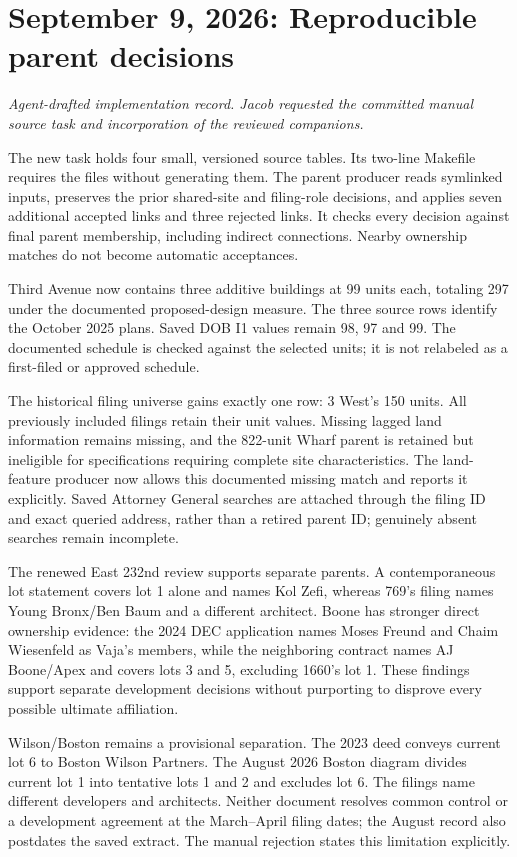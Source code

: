 \clearpage
\section*{September 9, 2026: Reproducible parent decisions}
\textit{Agent-drafted implementation record. Jacob requested the committed manual source task and incorporation of the reviewed companions.}

The new  task holds four small, versioned source tables. Its two-line Makefile requires the files without generating them. The parent producer reads symlinked inputs, preserves the prior shared-site and filing-role decisions, and applies seven additional accepted links and three rejected links. It checks every decision against final parent membership, including indirect connections. Nearby ownership matches do not become automatic acceptances.

Third Avenue now contains three additive buildings at 99 units each, totaling 297 under the documented proposed-design measure. The three source rows identify the October 2025 plans. Saved DOB I1 values remain 98, 97 and 99. The documented schedule is checked against the selected units; it is not relabeled as a first-filed or approved schedule.

The historical filing universe gains exactly one row: 3 West's 150 units. All previously included filings retain their unit values. Missing lagged land information remains missing, and the 822-unit Wharf parent is retained but ineligible for specifications requiring complete site characteristics. The land-feature producer now allows this documented missing match and reports it explicitly. Saved Attorney General searches are attached through the filing ID and exact queried address, rather than a retired parent ID; genuinely absent searches remain incomplete.

The renewed East 232nd review supports separate parents. A contemporaneous lot statement covers lot 1 alone and names Kol Zefi, whereas 769's filing names Young Bronx/Ben Baum and a different architect. Boone has stronger direct ownership evidence: the 2024 DEC application names Moses Freund and Chaim Wiesenfeld as Vaja's members, while the neighboring contract names AJ Boone/Apex and covers lots 3 and 5, excluding 1660's lot 1. These findings support separate development decisions without purporting to disprove every possible ultimate affiliation.

Wilson/Boston remains a provisional separation. The 2023 deed conveys current lot 6 to Boston Wilson Partners. The August 2026 Boston diagram divides current lot 1 into tentative lots 1 and 2 and excludes lot 6. The filings name different developers and architects. Neither document resolves common control or a development agreement at the March--April filing dates; the August record also postdates the saved extract. The manual rejection states this limitation explicitly.

